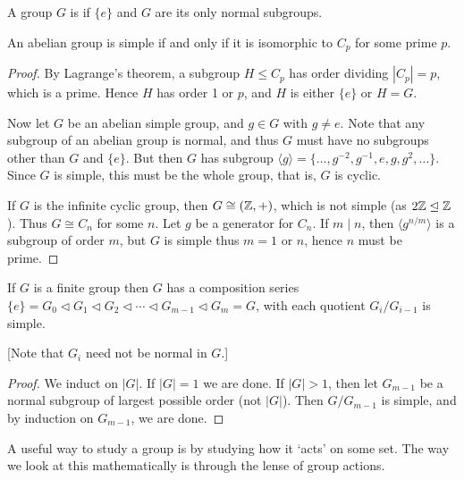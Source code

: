 \documentclass[a4paper]{scrreprt}
\begin{document}
\begin{definition}
	A group $G$ is  if $\{e\}$ and $G$ are its only normal subgroups.
\end{definition}

\begin{lemma}
	An abelian group is simple if and only if it is isomorphic to $C_p$ for some prime $p$.
\end{lemma}
\begin{proof}
	By Lagrange's theorem, a subgroup $H \leq C_p$ has order dividing $|C_p| = p$, which is a prime. Hence $H$ has order 1 or $p$, and $H$ is either $\{e\}$ or $H = G$.

	Now let $G$ be an abelian simple group, and $g \in G$ with $g \neq e$. Note that any subgroup of an abelian group is normal, and thus $G$ must have no subgroups other than $G$ and $\{e\}$. But then $G$ has subgroup $\langle g \rangle = \{\dots, g^{-2}, g^{-1}, e, g, g^2, \dots \}$. Since $G$ is simple, this must be the whole group, that is, $G$ is cyclic.

	If $G$ is the infinite cyclic group, then $G \cong (\mathbb{Z}, +)$, which is not simple (as $2 \mathbb{Z} \trianglelefteq \mathbb{Z}$). Thus $G \cong C_n$ for some $n$. Let $g$ be a generator for $C_n$. If $m \mid n$, then $\langle g^{n/m} \rangle$ is a subgroup of order $m$, but $G$ is simple thus $m = 1$ or $n$, hence $n$ must be prime.
\end{proof}

\begin{lemma}
	If $G$ is a finite group then $G$ has a composition series $\{e\} = G_0 \triangleleft G_1 \triangleleft G_2 \triangleleft \cdots \triangleleft G_{m- 1} \triangleleft G_m = G$, with each quotient $G_i / G_{i - 1}$ is simple.

	[Note that $G_i$ need not be normal in $G$.]
\end{lemma}
\begin{proof}
	We induct on $|G|$. If $|G| = 1$ we are done. If $|G| > 1$, then let $G_{m - 1}$ be a normal subgroup of largest possible order (not $|G|$). Then $G/G_{m - 1}$ is simple, and by induction on $G_{m - 1}$, we are done.
\end{proof}



A useful way to study a group is by studying how it `acts' on some set.
The way we look at this mathematically is through the lense of group actions.
\end{document}
